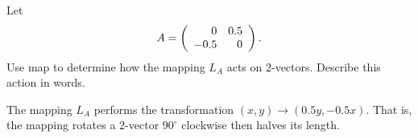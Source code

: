 \documentclass{ximera}
\begin{document}
\begin{computerExercise} \label{c4.3.14}
Let
\[
A = \left(\begin{array}{rr} 0 & 0.5\\ -0.5 &0\end{array}\right).
\]
Use {\sf map} to determine how the mapping $L_A$ acts on $2$-vectors.
Describe this action in words.

\begin{solution}

The mapping $L_A$ performs the transformation $(x,y) \rightarrow
(0.5y, -0.5x)$.  That is, the mapping rotates a 2-vector
$90^\circ$ clockwise then halves its length.

\end{solution}
\end{computerExercise}
\end{document}
